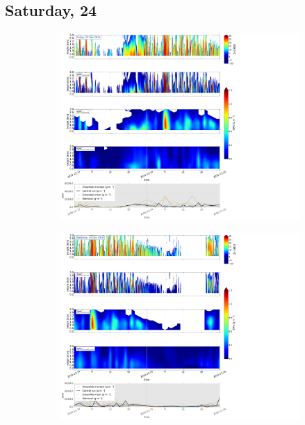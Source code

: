 \subsection{Saturday, \SI{24}{\dec}}
\label{sec:vertEM09:2412}
\begin{figure}[t]
	\centering
	\begin{subfigure}[t]{\textwidth}
		\includegraphics[trim={0.4cm .4cm 31.3cm 63.5cm},clip,width=\textwidth]{./fig_SWC/20161223}
		\caption{}\label{fig:SWP23}
	\end{subfigure}
	\begin{subfigure}[t]{\textwidth}
		\includegraphics[trim={0.4cm .4cm 31.3cm 63.5cm},clip,width=\textwidth]{./fig_SWC/20161224}
		\caption{}\label{fig:SWP24}
	\end{subfigure}
	\caption{}\label{fig:SWP2324}
\end{figure}
